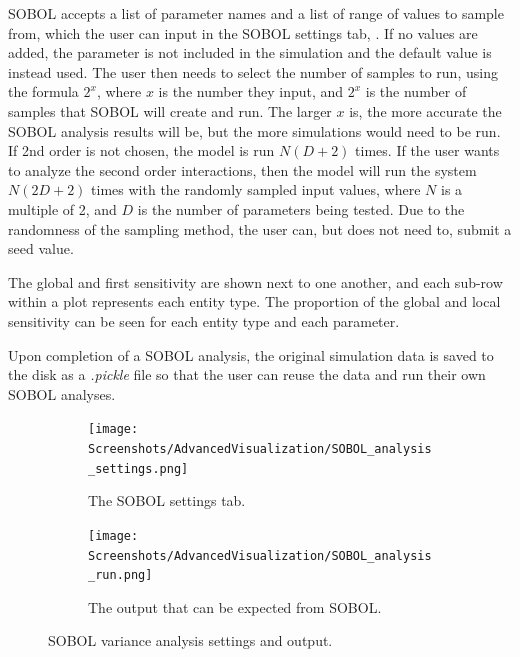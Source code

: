 SOBOL accepts a list of parameter names and a list of range of values to sample from, which the user can input in the SOBOL settings tab, . 
If no values are added, the parameter is not included in the simulation and the default value is instead used. 
The user then needs to select the number of samples to run, using the formula $2^x$, where $x$ is the number they input, and $2^x$ is the number of samples that SOBOL will create and run.
The larger $x$ is, the more accurate the SOBOL analysis results will be, but the more simulations would need to be run.
If 2nd order is not chosen, the model is run $N(D+2)$ times.
If the user wants to analyze the second order interactions, then the model will run the system $N(2D+2)$ times with the randomly sampled input values, where $N$ is a multiple of 2, and $D$ is the number of parameters being tested.
Due to the randomness of the sampling method, the user can, but does not need to, submit a seed value. 

The global and first sensitivity are shown next to one another, and each sub-row within a plot represents each entity type. 
The proportion of the global and local sensitivity can be seen for each entity type and each parameter.

Upon completion of a SOBOL analysis, the original simulation data is saved to the disk as a \textit{.pickle} file so that the user can reuse the data and run their own SOBOL analyses. 

\begin{figure}[h!]
    \centering
    \begin{subfigure}{0.49\linewidth}
        \centering
        \captionsetup{width=1\linewidth}
        \texttt{[image: Screenshots/AdvancedVisualization/SOBOL\_analysis\_settings.png]}
        \caption{
            The SOBOL settings tab. 
        }
        \label{fig:ss:av:SOBOL_analysis_settings}
    \end{subfigure}
    \hfill
    \begin{subfigure}{0.49\linewidth}
        \centering
        \captionsetup{width=1\linewidth}
        \texttt{[image: Screenshots/AdvancedVisualization/SOBOL\_analysis\_run.png]}
        \caption{
            The output that can be expected from SOBOL. 
        }
        \label{fig:ss:av:SOBOL_analysis_run}
    \end{subfigure}
    \caption{SOBOL variance analysis settings and output. }
\end{figure}

